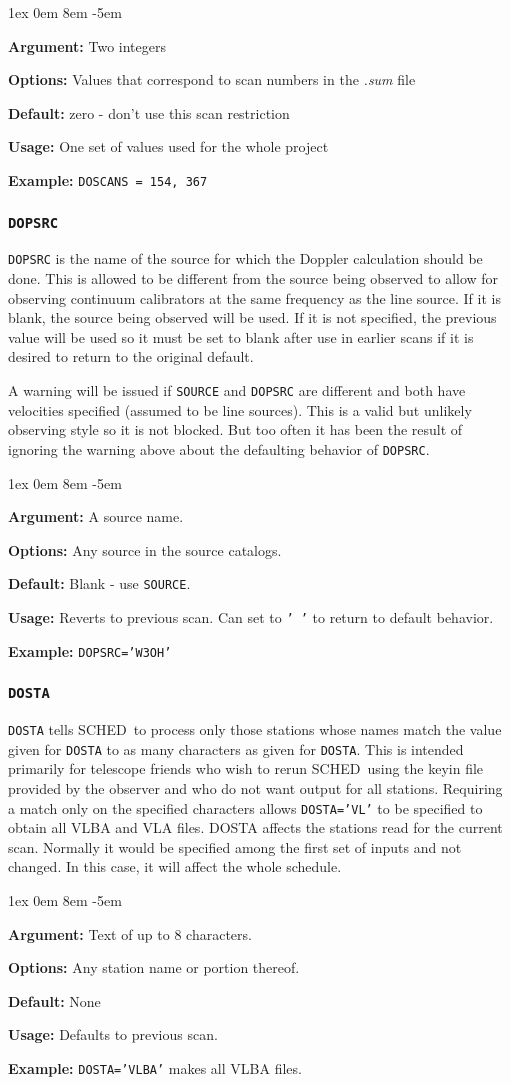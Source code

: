 \documentclass{report}
\newcommand{\schedb}{{\sc SCHED~}}
\newcommand{\rcwbox}[5]{
  \begin{list}{}{\parsep 1ex  \itemsep 0em
                 \leftmargin 8em  \itemindent -5em }
    \item {\bf Argument:} #1
    \item {\bf Options:}  #2
    \item {\bf Default:}  #3
    \item {\bf Usage:}    #4
    \item {\bf Example:}  #5
  \end{list}
}
\begin{document}
\rcwbox
{Two integers}
{Values that correspond to scan numbers in the {\sl .sum} file}
{zero - don't use this scan restriction}
{One set of values used for the whole project}
{{\tt DOSCANS = 154, 367}}


\subsubsection{\label{MP:DOPSRC}{\tt DOPSRC}}

{\tt DOPSRC} is the name of the source for which the Doppler
calculation should be done. This is allowed to be different from the
source being observed to allow for observing continuum calibrators at
the same frequency as the line source. If it is blank, the source
being observed will be used. If it is not specified, the previous
value will be used so it must be set to blank after use in earlier
scans if it is desired to return to the original default.

A warning will be issued if {\tt SOURCE} and {\tt DOPSRC} are
different and both have velocities specified (assumed to be line
sources).   This is a valid but unlikely observing style so it
is not blocked.  But too often it has been the result of ignoring
the warning above about the defaulting behavior of {\tt DOPSRC}.

\rcwbox
{A source name.}
{Any source in the source catalogs.}
{Blank - use {\tt SOURCE}.}
{Reverts to previous scan. Can set to {\tt ' '} to return to default
behavior.}
{{\tt DOPSRC='W3OH'}}

\subsubsection{\label{MP:DOSTA}{\tt DOSTA}}

{\tt DOSTA} tells \schedb to process only those stations whose
names match the value given for {\tt DOSTA} to as many characters as
given for {\tt DOSTA}. This is intended primarily for telescope
friends who wish to rerun \schedb using the keyin file provided by
the observer and who do not want output for all stations. Requiring a
match only on the specified characters allows {\tt DOSTA='VL'} to be
specified to obtain all VLBA and VLA files.  DOSTA affects the
stations read for the current scan.  Normally it would be specified
among the first set of inputs and not changed.  In this case, it will
affect the whole schedule.

\rcwbox
{Text of up to 8 characters.}
{Any station name or portion thereof.}
{None}
{Defaults to previous scan.}
{{\tt DOSTA='VLBA'} makes all VLBA files.}
\end{document}
